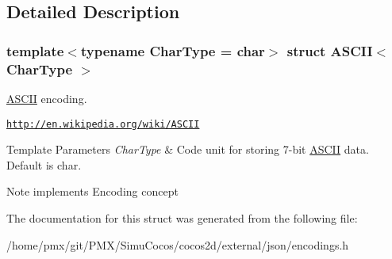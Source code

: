 \subsection{Detailed Description}
\subsubsection*{template$<$typename Char\+Type = char$>$\newline
struct A\+S\+C\+I\+I$<$ Char\+Type $>$}

\hyperlink{structASCII}{A\+S\+C\+II} encoding. 

\href{http://en.wikipedia.org/wiki/ASCII}{\tt http\+://en.\+wikipedia.\+org/wiki/\+A\+S\+C\+II} 
\begin{DoxyTemplParams}{Template Parameters}
{\em Char\+Type} & Code unit for storing 7-\/bit \hyperlink{structASCII}{A\+S\+C\+II} data. Default is char. \\
\hline
\end{DoxyTemplParams}
\begin{DoxyNote}{Note}
implements Encoding concept 
\end{DoxyNote}


The documentation for this struct was generated from the following file\+:\begin{DoxyCompactItemize}
\item 
/home/pmx/git/\+P\+M\+X/\+Simu\+Cocos/cocos2d/external/json/encodings.\+h\end{DoxyCompactItemize}
